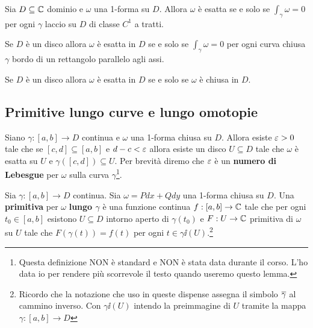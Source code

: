\begin{multicols*}{2}
\begin{proposition}\label{CaratterizzazioneEsatezzaInTerminiDiIntegraliSuLacci}
Sia $D\subseteq \mathbb{C}$ dominio e $\omega$ una 1-forma su $D$. Allora $\omega$ \`e esatta se e solo se $\int_\gamma\omega=0$ per ogni $\gamma$ laccio su $D$ di classe $C^1$ a tratti.
\end{proposition}

\begin{corollary}\label{CaratterizzazioneEsattezzaInDiscoConIntegraliSuBordiRettangolari}
Se $D$ \`e un disco allora $\omega$ \`e esatta in $D$ se e solo se $\int_\gamma\omega=0$ per ogni curva chiusa $\gamma$ bordo di un rettangolo parallelo agli assi.
\end{corollary}

\begin{corollary}
Se $D$ \`e un disco allora $\omega$ \`e esatta in $D$ se e solo se $\omega$ \`e chiusa in $D$.
\end{corollary}


\subsection{Primitive lungo curve e lungo omotopie}
\begin{lemma}\label{NumeroLebesgueFormeChiuse}
Siano $\gamma:[a,b]\to D$ continua e $\omega$ una 1-forma chiusa su $D$. Allora esiste $\varepsilon>0$ tale che se $[c,d]\subseteq [a,b]$ e $d-c<\varepsilon$ allora esiste un disco $U\subseteq D$ tale che $\omega$ \`e esatta su $U$ e $\gamma([c,d])\subseteq U$. Per brevit\`a diremo che $\varepsilon$ \`e un \textbf{numero di Lebesgue} per $\omega$ sulla curva $\gamma$\footnote{Questa definizione NON \`e standard e NON \`e stata data durante il corso. L'ho data io per rendere pi\`u scorrevole il testo quando useremo questo lemma.}.
\end{lemma}

\begin{definition}
Sia $\gamma:[a,b]\to D$ continua. Sia $\omega=Pdx+Qdy$ una 1-forma chiusa su $D$. Una \textbf{primitiva} per $\omega$ \textbf{lungo $\gamma$} \`e una funzione continua $f:[a,b]\to \mathbb{C}$ tale che per ogni $t_0\in[a,b]$ esistono $U\subseteq D$ intorno aperto di $\gamma(t_0)$ e $F:U\to \mathbb{C}$ primitiva di $\omega$ su $U$ tale che $F(\gamma(t))=f(t)$ per ogni $t\in\gamma\ii(U)$.\footnote{Ricordo che la notazione che uso in queste dispense assegna il simbolo $\overline{\gamma}$ al cammino inverso. Con $\gamma\ii(U)$ intendo la preimmagine di $U$ tramite la mappa $\gamma:[a,b]\to D$}
\end{definition}


\end{multicols*}

